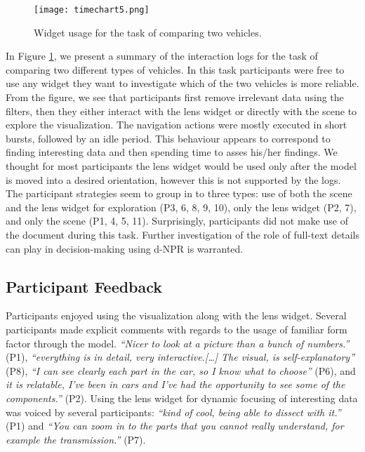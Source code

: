 	\begin{figure}
	 \centering  
	 \texttt{[image: timechart5.png]}  
	 \caption{Widget usage for the task of comparing two vehicles.}
	 \label{figure:timechart}
	\end{figure}

In Figure \ref{figure:timechart}, we present a summary of the interaction logs
for the task of comparing two different types of vehicles. In this task
participants were free to use any widget they want to investigate which of the
two vehicles is more reliable. From the figure, we see that participants first
remove irrelevant data using the filters, then they either interact with 
the lens widget or directly with the \threed scene to explore the visualization.
The navigation actions were mostly executed in short bursts, followed by an idle
period. This behaviour appears to correspond to finding interesting data and
then spending time to asses his/her findings. We thought for most participants
the lens widget would be used only after the \threed model is moved into a
desired orientation, however this is not supported by the logs. The participant
strategies seem to group in to three types: use of both the \threed scene and
the lens widget for exploration (P3, 6, 8, 9, 10), only the lens widget (P2, 7),
and only the \threed scene (P1, 4, 5, 11). Surprisingly, participants did not
make use of the document during this task. Further investigation of the role of
full-text details can play in decision-making using d-NPR is warranted.


 
\subsection{Participant Feedback}
Participants enjoyed using the \threed visualization along with the lens widget.
Several participants made explicit comments with regards to the usage of
familiar form factor through the \threed model. \emph{``Nicer to look at a
picture than a bunch of numbers.''} (P1), \emph{``everything is in detail, very
interactive.[\ldots] The visual, is self-explanatory''} (P8), \emph{``I can see
clearly each part in the car, so I know what to choose''} (P6), and \emph{it is
relatable, I've been in cars and I've had the opportunity to see some of the
components.''} (P2). Using the lens widget for dynamic focusing of interesting
data was voiced by several participants: \emph{``kind of cool, being able to
dissect with it.''} (P1) and \emph{``You can zoom in to the parts that you
cannot really understand, for example the transmission.''} (P7).

